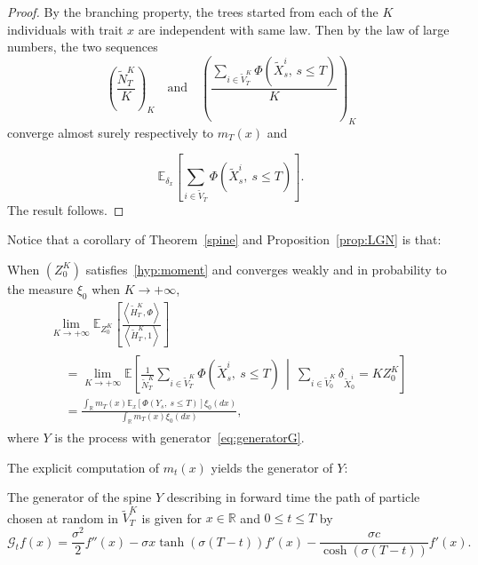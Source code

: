 \documentclass[AHL,Unicode,longabstracts,published]{cedram}
\newcommand{\Go}{\mathcal{G}}
\newcommand*\R{\mathbb{R}}
\newcommand*\E{\mathbb{E}}
\begin{document}
\begin{proof}
By the branching property, the trees started from each of the $K$ individuals with trait $x$ are independent with same law. Then by the law of large numbers, the two sequences
\[
\left(\frac{\widetilde N^K_{T}}{K}\right)_{K}\quad \text{and}\quad\left(\frac{\sum\limits_{i \in \widetilde{V}^K_{T}}\Phi\left(\widetilde X^i_{s},\, s\leq T\right)}{K}\right)_{K}
\]
converge almost surely respectively to $m_{T}(x)$ and

\[
\E_{\delta_{x}}\left[\sum_{i \in \widetilde V_{T}}\Phi\left(\widetilde X^i_{s},\ s\leq T\right) \right].
\]
The result follows.
\end{proof}



Notice that a corollary of Theorem~\ref{spine} and Proposition~\ref{prop:LGN} is that:
\begin{coro}\label{cor:hist-spine}
When $(Z^K_0)$ satisfies~\eqref{hyp:moment} and converges weakly and in probability to the measure $\xi_0$ when $K\rightarrow +\infty$,
\begin{multline}\label{eq:spine-processuslinearise}
\lim_{K \rightarrow +\infty}\E_{Z^K_0}\left[\frac{\left\langle \widetilde{H}^K_T,\Phi\right\rangle}{\left\langle \widetilde{H}^K_T,1\right\rangle}\right]\\
\begin{aligned}
&=\lim_{K \to +\infty}\E\left[\frac{1}{\widetilde N^K_{T}}\sum_{i \in \widetilde V^K_{T}}\Phi\left(\widetilde{X}^i_{s},\ s\leq T\right)\, \middle|\ \sum_{i \in \widetilde V^K_{0}} \delta_{\widetilde{X}^i_{0}}= K Z^K_0 \right] \\
&=\frac{ \int_{\R} m_{T}(x) \E_{x}\left[\Phi\left(Y_{s},\ s\leq T\right)\right]\xi_0(dx)}{\int_{\R} m_{T}(x) \xi_0(dx)},
\end{aligned}
\end{multline}
where $Y$ is the process with generator~\eqref{eq:generatorG}.
\end{coro}

The explicit computation of $m_t(x)$ yields the generator of $Y$:

\begin{prop}\label{prop:generatorG-explicite}
The generator of the spine $Y$ describing in forward time the path of particle chosen at random in $\widetilde V^K_T$ is given for $x\in \R$ and $0\le t\le T$ by
\begin{equation}\label{eq:generatorG-explicite}
\Go_{t}f(x)=\frac{\sigma^2}{2}f''(x)-\sigma x\tanh(\sigma (T-t))f'(x)-\frac{\sigma c}{\cosh(\sigma (T-t))} f'(x).
\end{equation}
\end{prop}
\end{document}
